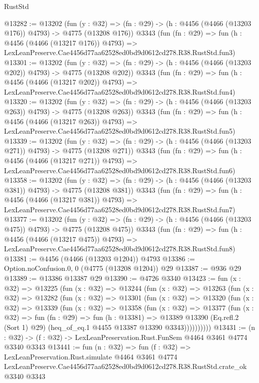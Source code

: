 \begin{lexlean}{RustStd}
\begin{coremodule}
@13282 := @13202
    (fun (y : @32) => (fn : @29) -> (h : @4456 (@4466 (@13203 @176)) @4793) -> @4775 (@13208 @176))
    @3343
    (fun (fn : @29) =>
    fun (h : @4456 (@4466 (@13217 @176)) @4793) =>
    LexLeanPreserve.Cae4456d77aa62528ed0bd9d0612cd278.R38.RustStd.fun3)
@13301 := @13202
    (fun (y : @32) => (fn : @29) -> (h : @4456 (@4466 (@13203 @202)) @4793) -> @4775 (@13208 @202))
    @3343
    (fun (fn : @29) =>
    fun (h : @4456 (@4466 (@13217 @202)) @4793) =>
    LexLeanPreserve.Cae4456d77aa62528ed0bd9d0612cd278.R38.RustStd.fun4)
@13320 := @13202
    (fun (y : @32) => (fn : @29) -> (h : @4456 (@4466 (@13203 @263)) @4793) -> @4775 (@13208 @263))
    @3343
    (fun (fn : @29) =>
    fun (h : @4456 (@4466 (@13217 @263)) @4793) =>
    LexLeanPreserve.Cae4456d77aa62528ed0bd9d0612cd278.R38.RustStd.fun5)
@13339 := @13202
    (fun (y : @32) => (fn : @29) -> (h : @4456 (@4466 (@13203 @271)) @4793) -> @4775 (@13208 @271))
    @3343
    (fun (fn : @29) =>
    fun (h : @4456 (@4466 (@13217 @271)) @4793) =>
    LexLeanPreserve.Cae4456d77aa62528ed0bd9d0612cd278.R38.RustStd.fun6)
@13358 := @13202
    (fun (y : @32) => (fn : @29) -> (h : @4456 (@4466 (@13203 @381)) @4793) -> @4775 (@13208 @381))
    @3343
    (fun (fn : @29) =>
    fun (h : @4456 (@4466 (@13217 @381)) @4793) =>
    LexLeanPreserve.Cae4456d77aa62528ed0bd9d0612cd278.R38.RustStd.fun7)
@13377 := @13202
    (fun (y : @32) => (fn : @29) -> (h : @4456 (@4466 (@13203 @475)) @4793) -> @4775 (@13208 @475))
    @3343
    (fun (fn : @29) =>
    fun (h : @4456 (@4466 (@13217 @475)) @4793) =>
    LexLeanPreserve.Cae4456d77aa62528ed0bd9d0612cd278.R38.RustStd.fun8)
@13381 := @4456 (@4466 (@13203 @1204)) @4793
@13386 := Option.noConfusion.{0, 0} (@4775 (@13208 @1204)) @29
@13387 := @936 @29
@13389 := @13386 @13387 @29
@13390 := @4726 @3340
@13423 := fun (x : @32) =>
  @13225
    (fun (x : @32) =>
    @13244
      (fun (x : @32) =>
      @13263
        (fun (x : @32) =>
        @13282
          (fun (x : @32) =>
          @13301
            (fun (x : @32) =>
            @13320
              (fun (x : @32) =>
              @13339
                (fun (x : @32) =>
                @13358
                  (fun (x : @32) =>
                  @13377
                    (fun (x : @32) =>
                    fun (fn : @29) =>
                    fun (h : @13381) =>
                    @13389
                      @13390
                      (Eq.refl.{2} (Sort 1) @29)
                      (heq_of_eq.{1} @4455 @13387 @13390 @3343))))))))))
@13431 := (n : @32) -> (f : @32) -> LexLeanPreservation.Rust.FunSem @4464 @3461 @4774 @3340 @3343
@13441 := fun (n : @32) =>
  fun (f : @32) =>
  LexLeanPreservation.Rust.simulate
    @4464
    @3461
    @4774
    LexLeanPreserve.Cae4456d77aa62528ed0bd9d0612cd278.R38.RustStd.crate_ok
    @3340
    @3343
\end{coremodule}
\end{lexlean}
